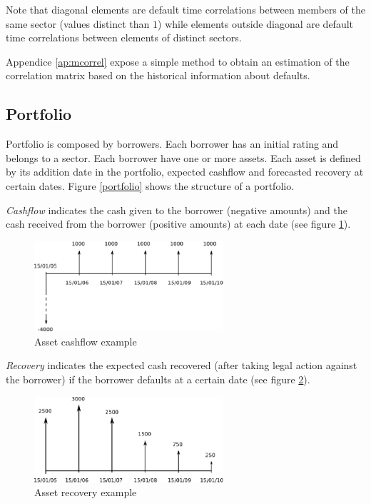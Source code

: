 \documentclass[a4paper,12pt,final]{article}
\begin{document}
Note that diagonal elements are default time correlations between members of the 
same sector (values distinct than $1$) while elements outside diagonal are 
default time correlations between elements of distinct sectors.
\newline

Appendice \ref{ap:mcorrel} expose a simple method to obtain an estimation of
the correlation matrix based on the historical information about defaults.

\subsection{Portfolio}
Portfolio is composed by borrowers. Each borrower has an initial rating and 
belongs to a sector. Each borrower have one or more assets. Each asset
is defined by its addition date in the portfolio, expected cashflow and 
forecasted recovery at certain dates. Figure \ref{portfolio} shows the 
structure of a portfolio.
\newline

\emph{Cashflow} indicates the cash given to the borrower (negative amounts) and the
cash received from the borrower (positive amounts) at each date (see figure \ref{cashflow}).

\begin{figure}[!hbt]
\begin{center}
\includegraphics[width=7cm, angle=0]{./images/cashflow.eps}
\caption{Asset cashflow example}
\label{cashflow}
\end{center}
\end{figure}
\FloatBarrier

\emph{Recovery} indicates the expected cash recovered (after taking legal action against 
the borrower) if the borrower defaults at a certain date (see figure \ref{recovery}).

\begin{figure}[!hbt]
\begin{center}
\includegraphics[width=7cm, angle=0]{./images/recovery.eps}
\caption{Asset recovery example}
\label{recovery}
\end{center}
\end{figure}
\FloatBarrier
\end{document}
